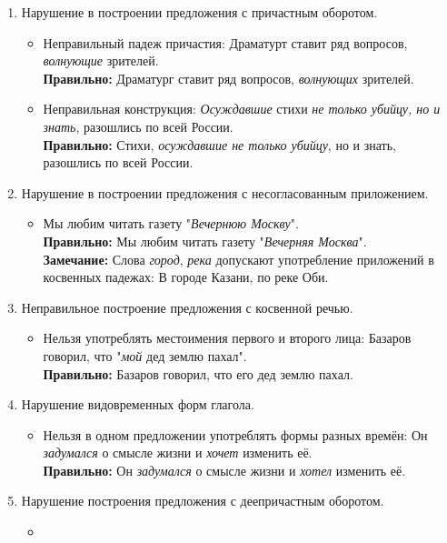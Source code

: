 \documentclass{article}
\begin{document}
\begin{enumerate}
\item
  Нарушение в построении предложения с причастным оборотом.
  \begin{itemize}
  \item
    Неправильный падеж причастия: Драматурт ставит ряд вопросов, \emph{волнующие} зрителей.\\
    \textbf{Правильно:} Драматург ставит ряд вопросов, \emph{волнующих} зрителей.
  \item
    Неправильная конструкция: \emph{Осуждавшие} стихи \emph{не только убийцу, но и знать}, разошлись по всей России.\\
    \textbf{Правильно:} Стихи, \emph{осуждавшие не только убийцу}, но и знать, разошлись по всей России.
  \end{itemize}
\item
  Нарушение в построении предложения с несогласованным приложением.
  \begin{itemize}
  \item
    Мы любим читать газету "\emph{Вечернюю Москву}".\\
    \textbf{Правильно:} Мы любим читать газету "\emph{Вечерняя Москва}".\\
    \textbf{Замечание:} Слова \emph{город}, \emph{река} допускают употребление приложений в косвенных падежах:
    В городе Казани, по реке Оби.
  \end{itemize}
\item
  Неправильное построение предложения с косвенной речью.
  \begin{itemize}
  \item
    Нельзя употреблять местоимения первого и второго лица: Базаров говорил, что "\emph{мой} дед землю пахал".\\
    \textbf{Правильно:} Базаров говорил, что его дед землю пахал.
  \end{itemize}
\item
  Нарушение видовременных форм глагола.
  \begin{itemize}
  \item
    Нельзя в одном предложении употреблять формы разных времён: Он \emph{задумался} о смысле жизни и
    \emph{хочет} изменить её.\\
    \textbf{Правильно:} Он \emph{задумался} о смысле жизни и \emph{хотел} изменить её.
  \end{itemize}
\item
  Нарушение построения предложения с деепричастным оборотом.
  \begin{itemize}
  \item

\end{itemize}
\end{enumerate}
\end{document}
